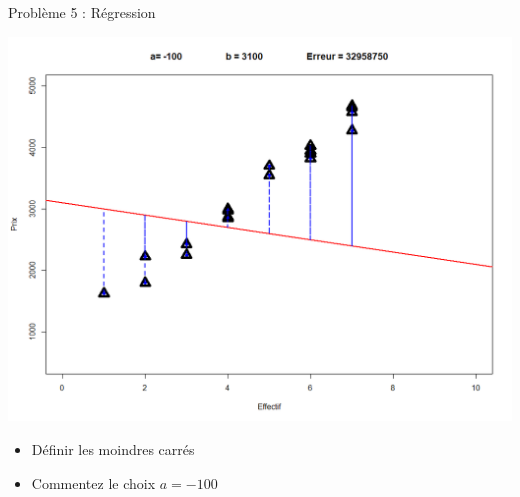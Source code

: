 \documentclass[10pt]{beamer}
\begin{document}
\begin{frame}{Problème 5 : Régression}
\begin{minipage}{0.53\textwidth}
\begin{center}
\includegraphics[height=1\textwidth]{figures/reg1.png}
\end{center}
\end{minipage}

 
\begin{itemize}
    \item Définir les moindres carrés
    \item Commentez le choix $a = -100$
\end{itemize}

\end{frame}
\end{document}
